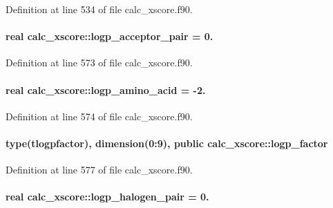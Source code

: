 Definition at line 534 of file calc\-\_\-xscore.\-f90.

\hypertarget{classcalc__xscore_adacad695c4d08392a2210054ce6f2f82}{
\paragraph[{logp\-\_\-acceptor\-\_\-pair}]{\setlength{\rightskip}{0pt plus 5cm}real calc\-\_\-xscore\-::logp\-\_\-acceptor\-\_\-pair = 0.}}\label{classcalc__xscore_adacad695c4d08392a2210054ce6f2f82}


Definition at line 573 of file calc\-\_\-xscore.\-f90.

\hypertarget{classcalc__xscore_a484c6e7061a28ca2c8fb13eef56e75fd}{
\paragraph[{logp\-\_\-amino\-\_\-acid}]{\setlength{\rightskip}{0pt plus 5cm}real calc\-\_\-xscore\-::logp\-\_\-amino\-\_\-acid = -\/2.}}\label{classcalc__xscore_a484c6e7061a28ca2c8fb13eef56e75fd}


Definition at line 574 of file calc\-\_\-xscore.\-f90.

\hypertarget{classcalc__xscore_a15e10912826f48cd33ca1d0c8117ce28}{
\paragraph[{logp\-\_\-factor}]{\setlength{\rightskip}{0pt plus 5cm}type({\bf tlogpfactor}), dimension(0\-:9), public calc\-\_\-xscore\-::logp\-\_\-factor}}\label{classcalc__xscore_a15e10912826f48cd33ca1d0c8117ce28}


Definition at line 577 of file calc\-\_\-xscore.\-f90.

\hypertarget{classcalc__xscore_a9c2ef721e4974450e49be0b2e5bbef01}{
\paragraph[{logp\-\_\-halogen\-\_\-pair}]{\setlength{\rightskip}{0pt plus 5cm}real calc\-\_\-xscore\-::logp\-\_\-halogen\-\_\-pair = 0.}}\label{classcalc__xscore_a9c2ef721e4974450e49be0b2e5bbef01}


